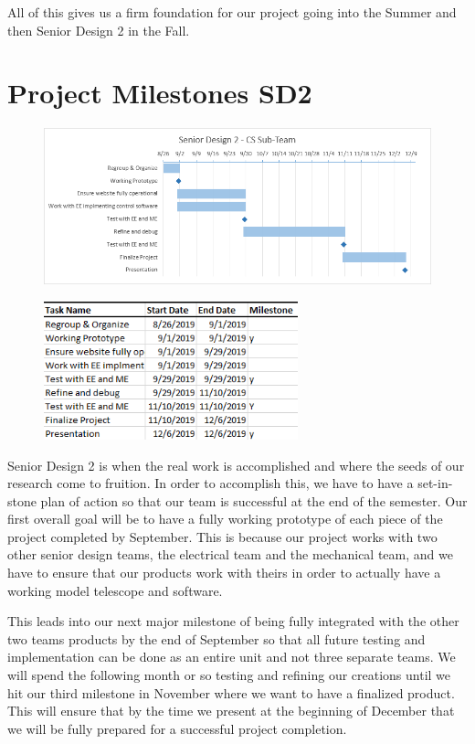 \documentclass[12pt]{report}
\begin{document}
\begin{enumerate}
All of this gives us a firm foundation for our project going into the Summer and then Senior Design 2 in the Fall.

\section*{Project Milestones SD2}

\begin{figure}[h]
	\centering
	\includegraphics[width=\linewidth]{SD2Gantt}
\end{figure}

\begin{figure}[h]
	\centering
	\includegraphics[width=0.6\linewidth, height=4.0cm]{SD2Dates}
\end{figure}

Senior Design 2 is when the real work is accomplished and where the seeds of our research come to fruition. In order to accomplish this, we have to have a set-in-stone plan of action so that our team is successful at the end of the semester. Our first overall goal will be to have a fully working prototype of each piece of the project completed by September. This is because our project works with two other senior design teams, the electrical team and the mechanical team, and we have to ensure that our products work with theirs in order to actually have a working model telescope and software.

This leads into our next major milestone of being fully integrated with the other two teams products by the end of September so that all future testing and implementation can be done as an entire unit and not three separate teams. We will spend the following month or so testing and refining our creations until we hit our third milestone in November where we want to have a finalized product. This will ensure that by the time we present at the beginning of December that we will be fully prepared for a successful project completion.


\end{enumerate}
\end{document}
